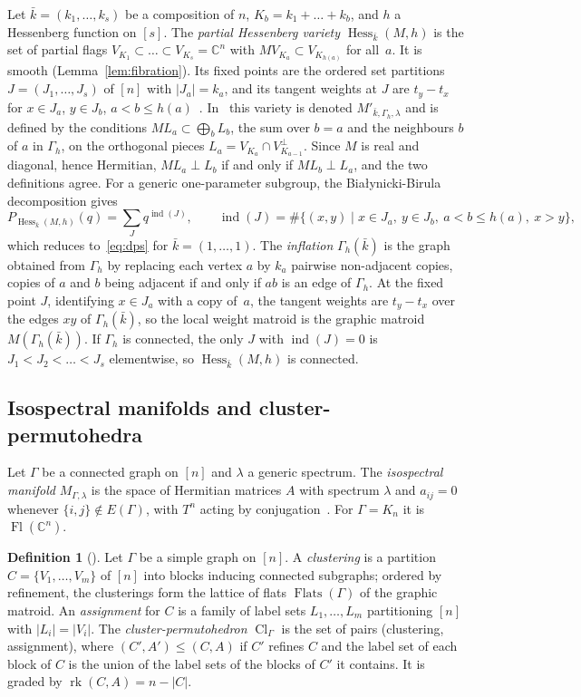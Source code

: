 \documentclass[11pt,a4paper]{article}
\numberwithin{equation}{section}
\theoremstyle{plain}
\theoremstyle{definition}
\newtheorem{definition}[theorem]{Definition}
\theoremstyle{remark}
\newcommand{\C}{\mathbb{C}}
\DeclareMathOperator{\Fl}{Fl}
\DeclareMathOperator{\Hess}{Hess}
\DeclareMathOperator{\rk}{rk}
\DeclareMathOperator{\Flats}{Flats}
\DeclareMathOperator{\Cl}{Cl}
\DeclareMathOperator{\ind}{ind}
\begin{document}
Let $\bar k=(k_1,\dots,k_s)$ be a composition of $n$, $K_b=k_1+\dots+k_b$, and $h$ a Hessenberg function on $[s]$. The \emph{partial Hessenberg variety} $\Hess_{\bar k}(M,h)$ is the set of partial flags $V_{K_1}\subset\dots\subset V_{K_s}=\C^n$ with $MV_{K_a}\subset V_{K_{h(a)}}$ for all~$a$. It is smooth (Lemma~\ref{lem:fibration}). Its fixed points are the ordered set partitions $J=(J_1,\dots,J_s)$ of $[n]$ with $|J_a|=k_a$, and its tangent weights at $J$ are $t_y-t_x$ for $x\in J_a$, $y\in J_b$, $a<b\leqslant h(a)$~\cite[§5]{AB24}. In~\cite{AB24} this variety is denoted $M'_{\bar k,\Gamma_h,\lambda}$ and is defined by the conditions $ML_a\subset\bigoplus_bL_b$, the sum over $b=a$ and the neighbours $b$ of $a$ in $\Gamma_h$, on the orthogonal pieces $L_a=V_{K_a}\cap V_{K_{a-1}}^\perp$. Since $M$ is real and diagonal, hence Hermitian, $ML_a\perp L_b$ if and only if $ML_b\perp L_a$, and the two definitions agree. For a generic one-parameter subgroup, the Białynicki-Birula decomposition gives
\begin{equation}\label{eq:bb}
P_{\Hess_{\bar k}(M,h)}(q)=\sum_Jq^{\ind(J)},\qquad\ind(J)=\#\{(x,y)\mid x\in J_a,\ y\in J_b,\ a<b\leqslant h(a),\ x>y\},
\end{equation}
which reduces to~\eqref{eq:dps} for $\bar k=(1,\dots,1)$. The \emph{inflation} $\Gamma_h(\bar k)$ is the graph obtained from $\Gamma_h$ by replacing each vertex $a$ by $k_a$ pairwise non-adjacent copies, copies of $a$ and $b$ being adjacent if and only if $ab$ is an edge of $\Gamma_h$. At the fixed point $J$, identifying $x\in J_a$ with a copy of~$a$, the tangent weights are $t_y-t_x$ over the edges $xy$ of $\Gamma_h(\bar k)$, so the local weight matroid is the graphic matroid $M(\Gamma_h(\bar k))$. If $\Gamma_h$ is connected, the only $J$ with $\ind(J)=0$ is $J_1<J_2<\dots<J_s$ elementwise, so $\Hess_{\bar k}(M,h)$ is connected.

\subsection{Isospectral manifolds and cluster-permutohedra}
Let $\Gamma$ be a connected graph on $[n]$ and $\lambda$ a generic spectrum. The \emph{isospectral manifold} $M_{\Gamma,\lambda}$ is the space of Hermitian matrices $A$ with spectrum $\lambda$ and $a_{ij}=0$ whenever $\{i,j\}\notin E(\Gamma)$, with $T^n$ acting by conjugation~\cite{AB24}. For $\Gamma=K_n$ it is $\Fl(\C^n)$.

\begin{definition}[{\cite[Def.~2.14]{AB24}}]\label{def:cluster}
Let $\Gamma$ be a simple graph on $[n]$. A \emph{clustering} is a partition $C=\{V_1,\dots,V_m\}$ of $[n]$ into blocks inducing connected subgraphs; ordered by refinement, the clusterings form the lattice of flats $\Flats(\Gamma)$ of the graphic matroid. An \emph{assignment} for $C$ is a family of label sets $L_1,\dots,L_m$ partitioning $[n]$ with $|L_i|=|V_i|$. The \emph{cluster-permutohedron} $\Cl_\Gamma$ is the set of pairs (clustering, assignment), where $(C',A')\leqslant(C,A)$ if $C'$ refines $C$ and the label set of each block of $C$ is the union of the label sets of the blocks of $C'$ it contains. It is graded by $\rk(C,A)=n-|C|$.
\end{definition}
\end{document}
